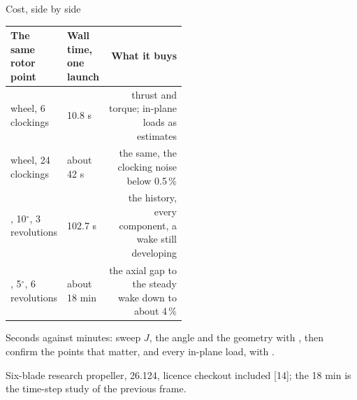 \begin{frame}{Cost, side by side}
\relax %
{\ftstablesize\renewcommand{\arraystretch}{1.15}
\begin{tabularx}{\linewidth}{@{}P{0.28\linewidth}P{0.22\linewidth}R@{}}
\toprule
\textbf{The same rotor point} & \textbf{Wall time, one launch} & \textbf{What it buys} \\
\midrule
{} wheel, 6 clockings & 10.8 s & thrust and torque; in-plane
  loads as estimates \\
 wheel, 24 clockings & about 42 s & the same, the
  clocking noise below 0.5\,\% \\
, 10\(^\circ\), 3 revolutions & 102.7 s & the history,
  every component, a wake still developing \\
, 5\(^\circ\), 6 revolutions & about 18 min & the axial
  gap to the steady wake down to about 4\,\% \\
\bottomrule
\end{tabularx}}
\par\vspace{1.5mm}
\begin{takeaway}Seconds against minutes: sweep \(J\), the angle and the
geometry with , then confirm the points that matter,
and every in-plane load, with .\end{takeaway}
{\scriptsize Six-blade research propeller, 26.124, licence checkout included
[14]; the 18 min is the time-step study of the previous frame.\par}
\end{frame}
